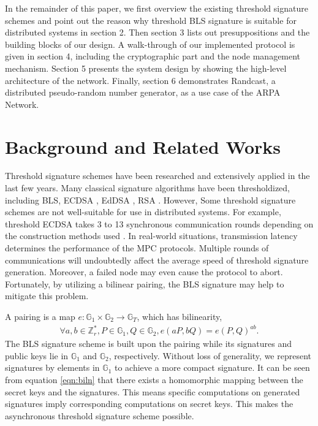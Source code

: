 \documentclass[11pt]{article}
\begin{document}
In the remainder of this paper, we first overview the existing threshold signature schemes and point out the reason why threshold BLS signature is suitable for distributed systems in section 2. Then section 3 lists out presuppositions and the building blocks of our design. A walk-through of our implemented protocol is given in section 4, including the cryptographic part and the node management mechanism. Section 5 presents the system design by showing the high-level architecture of the network. Finally, section 6 demonstrates Randcast, a distributed pseudo-random number generator, as a use case of the ARPA Network.

\section{Background and Related Works}

Threshold signature schemes have been researched and extensively applied in the last few years. Many classical signature algorithms have been thresholdized, including BLS, ECDSA \cite{gennaro2018fast}, EdDSA \cite{stinson2001provably}, RSA \cite{damgaard2001practical}. However, Some threshold signature schemes are not well-suitable for use in distributed systems. For example, threshold ECDSA takes 3 to 13 synchronous communication rounds depending on the construction methods used \cite{aumasson2020survey}. In real-world situations, transmission latency determines the performance of the MPC protocols. Multiple rounds of communications will undoubtedly affect the average speed of threshold signature generation. Moreover, a failed node may even cause the protocol to abort. Fortunately, by utilizing a bilinear pairing, the BLS signature may help to mitigate this problem.

A pairing is a map $e:\mathbb{G}_1 \times \mathbb{G}_2 \to \mathbb{G}_T$, which has bilinearity, 
\begin{align}\label{eqn:biln}
    \forall a,b \in \mathbb{Z}_r^*, P \in \mathbb{G}_1, Q \in \mathbb{G}_2, e(aP,bQ)=e(P,Q)^{ab}.
\end{align}
The BLS signature scheme is built upon the pairing while its signatures and public keys lie in $\mathbb{G}_1$ and $\mathbb{G}_2$, respectively. Without loss of generality, we represent signatures by elements in $\mathbb{G}_1$ to achieve a more compact signature. It can be seen from equation \ref{eqn:biln} that there exists a homomorphic mapping between the secret keys and the signatures. This means specific computations on generated signatures imply corresponding computations on secret keys. This makes the asynchronous threshold signature scheme possible.
\end{document}
